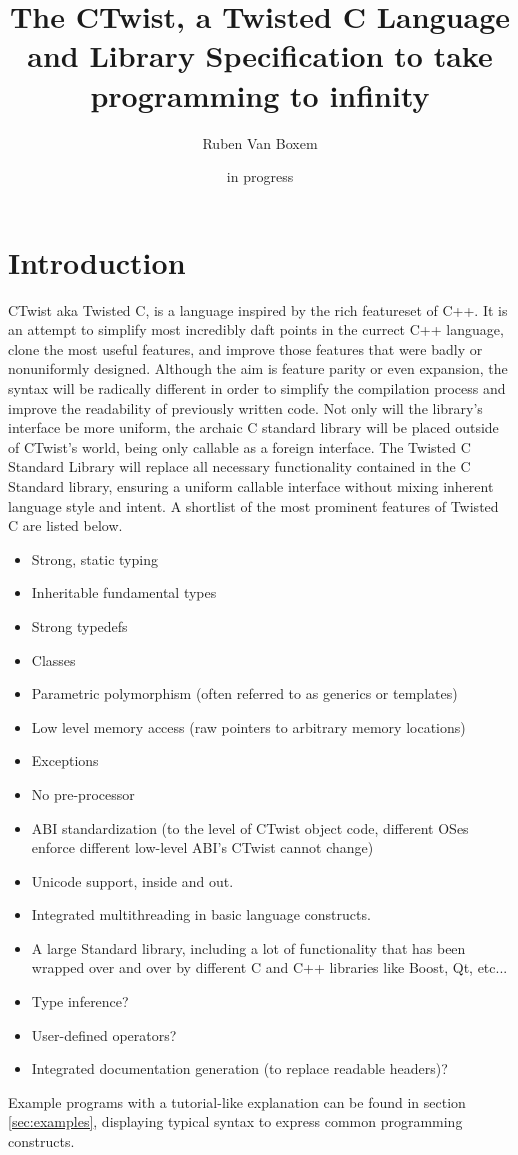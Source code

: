 \documentclass[a4paper,11pt]{article}
\title{The CTwist, a Twisted C Language and Library Specification to take programming to infinity}
\date{in progress}
\author{Ruben Van Boxem}
\begin{document}
\maketitle

\newpage

\tableofcontents
\thispagestyle{empty}
\newpage

\section{Introduction}

CTwist aka Twisted C, is a language inspired by the rich featureset of C++.
It is an attempt to simplify most incredibly daft points in the currect C++ language, clone the most useful features, and improve those features that were badly or nonuniformly designed.
Although the aim is feature parity or even expansion, the syntax will be radically different in order to simplify the compilation process and improve the readability of previously written code.
Not only will the library’s interface be more uniform, the archaic C standard library will be placed outside of CTwist’s world, being only callable as a foreign interface.
The Twisted C Standard Library will replace all necessary functionality contained in the C Standard library, ensuring a uniform callable interface without mixing inherent language style and intent.
A shortlist of the most prominent features of Twisted C are listed below.

\begin{itemize}
  \item Strong, static typing
  \item Inheritable fundamental types
  \item Strong typedefs
  \item Classes
  \item Parametric polymorphism (often referred to as generics or templates)
  \item Low level memory access (raw pointers to arbitrary memory locations)
  \item Exceptions
  \item No pre-processor
  \item ABI standardization (to the level of CTwist object code, different OSes enforce different low-level ABI’s CTwist cannot change)
  \item Unicode support, inside and out.
  \item Integrated multithreading in basic language constructs.
  \item A large Standard library, including a lot of functionality that has been wrapped over and over by different C and C++ libraries like Boost, Qt, etc...
  \item Type inference?
  \item User-defined operators?
  \item Integrated documentation generation (to replace readable headers)?
\end{itemize}
Example programs with a tutorial-like explanation can be found in section \ref{sec:examples}, displaying typical syntax to express common programming constructs.
\end{document}
